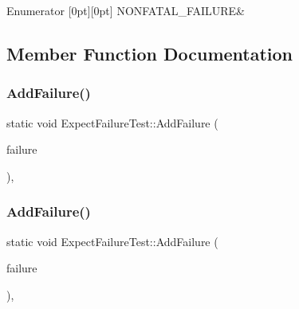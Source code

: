 \begin{DoxyEnumFields}{Enumerator}
[0pt][0pt]{}\mbox{\label{class_expect_failure_test_aad05da10bb15d21a434eba3b37011406a33bb9a7c037092ef3fe3e8f66bb2d518}} 
N\+O\+N\+F\+A\+T\+A\+L\+\_\+\+F\+A\+I\+L\+U\+RE&\\
\hline

\end{DoxyEnumFields}


\subsection{Member Function Documentation}
\mbox{\label{class_expect_failure_test_ab9aeb7820ff7953fc2975ecc5abd046b}} 
\subsubsection{\texorpdfstring{AddFailure()}{AddFailure()}\hspace{0.1cm}{\footnotesize\ttfamily [1/3]}}
{\footnotesize\ttfamily static void Expect\+Failure\+Test\+::\+Add\+Failure (\begin{DoxyParamCaption}\item[{\mbox{\hyperlink{class_expect_failure_test_aad05da10bb15d21a434eba3b37011406}{Failure\+Mode}}}]{failure }\end{DoxyParamCaption})\hspace{0.3cm}{\ttfamily [inline]}, {\ttfamily [static]}}

\mbox{\label{class_expect_failure_test_ab9aeb7820ff7953fc2975ecc5abd046b}} 
\subsubsection{\texorpdfstring{AddFailure()}{AddFailure()}\hspace{0.1cm}{\footnotesize\ttfamily [2/3]}}
{\footnotesize\ttfamily static void Expect\+Failure\+Test\+::\+Add\+Failure (\begin{DoxyParamCaption}\item[{\mbox{\hyperlink{class_expect_failure_test_aad05da10bb15d21a434eba3b37011406}{Failure\+Mode}}}]{failure }\end{DoxyParamCaption})\hspace{0.3cm}{\ttfamily [inline]}, {\ttfamily [static]}}

